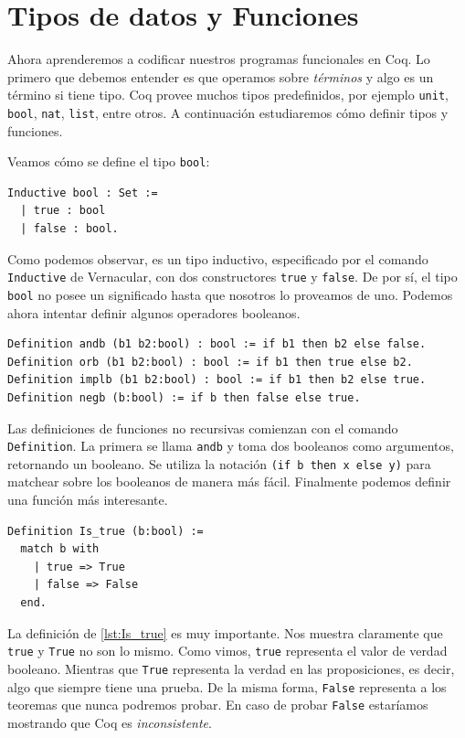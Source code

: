 
\section{Tipos de datos y Funciones}

Ahora aprenderemos a codificar nuestros programas funcionales en Coq. Lo primero que debemos entender es que operamos sobre \textit{términos} y algo es un término si tiene tipo. Coq provee muchos tipos predefinidos, por ejemplo \lstinline{unit}, \lstinline{bool}, \lstinline{nat}, \lstinline{list}, entre otros. A continuación estudiaremos cómo definir tipos y funciones.

Veamos cómo se define el tipo \lstinline{bool}:

\begin{lstlisting}
Inductive bool : Set :=
  | true : bool
  | false : bool.
\end{lstlisting}

Como podemos observar, es un tipo inductivo, especificado por el comando \lstinline{Inductive} de Vernacular, con dos constructores \lstinline{true} y \lstinline{false}. De por sí, el tipo \lstinline{bool} no posee un significado hasta que nosotros lo proveamos de uno. Podemos ahora intentar definir algunos operadores booleanos.
\begin{lstlisting}
Definition andb (b1 b2:bool) : bool := if b1 then b2 else false.
Definition orb (b1 b2:bool) : bool := if b1 then true else b2.
Definition implb (b1 b2:bool) : bool := if b1 then b2 else true.
Definition negb (b:bool) := if b then false else true.
\end{lstlisting}

Las definiciones de funciones no recursivas comienzan con el comando \lstinline{Definition}. La primera se llama \lstinline{andb} y toma dos booleanos como argumentos, retornando un booleano. Se utiliza la notación \lstinline{(if b then x else y)} para matchear sobre los booleanos de manera más fácil. Finalmente podemos definir una función más interesante.

\begin{lstlisting}[frame=tb,caption={Definición de \lstinline{Is_true}},label=lst:Is_true]
Definition Is_true (b:bool) :=
  match b with
    | true => True
    | false => False
  end.
\end{lstlisting}

La definición de \ref{lst:Is_true} es muy importante. Nos muestra claramente que \lstinline{true} y \lstinline{True} no son lo mismo. Como vimos, \lstinline{true} representa el valor de verdad booleano. Mientras que \lstinline{True} representa la verdad en las proposiciones, es decir, algo que siempre tiene una prueba. De la misma forma, \lstinline{False} representa a los teoremas que nunca podremos probar. En caso de probar \lstinline{False} estaríamos mostrando que Coq es \emph{inconsistente}.

